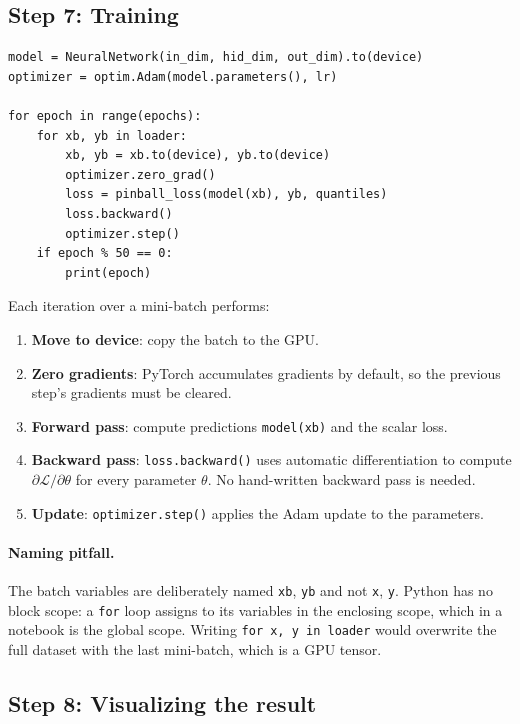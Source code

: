 \documentclass[11pt]{article}
\begin{document}
\subsection{Step 7: Training}

\begin{lstlisting}
model = NeuralNetwork(in_dim, hid_dim, out_dim).to(device)
optimizer = optim.Adam(model.parameters(), lr)

for epoch in range(epochs):
    for xb, yb in loader:
        xb, yb = xb.to(device), yb.to(device)
        optimizer.zero_grad()
        loss = pinball_loss(model(xb), yb, quantiles)
        loss.backward()
        optimizer.step()
    if epoch % 50 == 0:
        print(epoch)
\end{lstlisting}

Each iteration over a mini-batch performs:
\begin{enumerate}
  \item \textbf{Move to device}: copy the batch to the GPU.
  \item \textbf{Zero gradients}: PyTorch accumulates gradients by default, so
        the previous step's gradients must be cleared.
  \item \textbf{Forward pass}: compute predictions \texttt{model(xb)} and the
        scalar loss.
  \item \textbf{Backward pass}: \texttt{loss.backward()} uses automatic
        differentiation to compute
        $\partial\mathcal{L}/\partial\theta$ for every parameter $\theta$.
        No hand-written backward pass is needed.
  \item \textbf{Update}: \texttt{optimizer.step()} applies the Adam update to
        the parameters.
\end{enumerate}

\paragraph{Naming pitfall.}
The batch variables are deliberately named \texttt{xb}, \texttt{yb} and not
\texttt{x}, \texttt{y}. Python has no block scope: a \texttt{for} loop assigns
to its variables in the enclosing scope, which in a notebook is the global
scope. Writing \texttt{for x, y in loader} would overwrite the full dataset
with the last mini-batch, which is a GPU tensor.

\subsection{Step 8: Visualizing the result}
\end{document}
